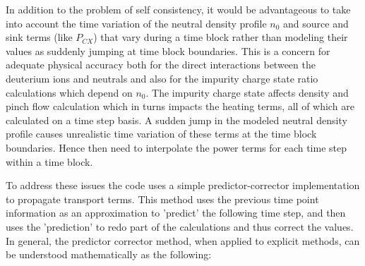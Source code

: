 In addition to the problem of self consistency, it would be advantageous to take into account the time variation of the neutral density profile $n_0$ and source and sink terms (like $P_{CX}$) that vary during a time block rather than modeling their values as suddenly jumping at time block boundaries. This is a concern for adequate physical accuracy both for the direct interactions between the deuterium ions and neutrals and also for the impurity charge state ratio calculations which depend on $n_0$. The impurity charge state affects density and pinch flow calculation which in turns impacts the heating terms, all of which are calculated on a time step basis. A sudden jump in the modeled neutral density profile causes unrealistic time variation of these terms at the time block boundaries. Hence then need to interpolate the power terms for each time step within a time block.

To address these issues the code uses a simple predictor-corrector implementation to propagate transport terms. This method uses the previous time point information as an approximation to 'predict' the following time step, and then uses the 'prediction' to redo part of the calculations and thus correct the values. In general, the predictor corrector method, when applied to explicit methods, can be understood mathematically as the following:

